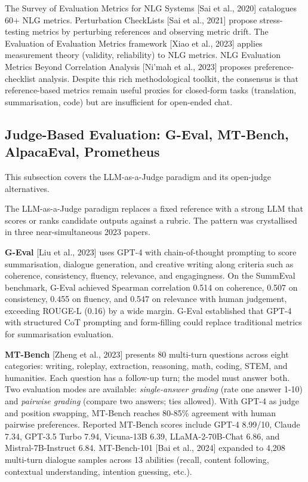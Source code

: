 The Survey of Evaluation Metrics for NLG Systems {[}Sai et al., 2020{]} catalogues 60+ NLG metrics. Perturbation CheckLists {[}Sai et al., 2021{]} propose stress-testing metrics by perturbing references and observing metric drift. The Evaluation of Evaluation Metrics framework {[}Xiao et al., 2023{]} applies measurement theory (validity, reliability) to NLG metrics. NLG Evaluation Metrics Beyond Correlation Analysis {[}Ni'mah et al., 2023{]} proposes preference-checklist analysis. Despite this rich methodological toolkit, the consensus is that reference-based metrics remain useful proxies for closed-form tasks (translation, summarisation, code) but are insufficient for open-ended chat.

\subsection{Judge-Based Evaluation: G-Eval, MT-Bench, AlpacaEval, Prometheus}\label{judge-based-evaluation-g-eval-mt-bench-alpacaeval-prometheus}

This subsection covers the LLM-as-a-Judge paradigm and its open-judge alternatives.

The LLM-as-a-Judge paradigm replaces a fixed reference with a strong LLM that scores or ranks candidate outputs against a rubric. The pattern was crystallised in three near-simultaneous 2023 papers.

\textbf{G-Eval} {[}Liu et al., 2023{]} uses GPT-4 with chain-of-thought prompting to score summarisation, dialogue generation, and creative writing along criteria such as coherence, consistency, fluency, relevance, and engagingness. On the SummEval benchmark, G-Eval achieved Spearman correlation 0.514 on coherence, 0.507 on consistency, 0.455 on fluency, and 0.547 on relevance with human judgement, exceeding ROUGE-L (0.16) by a wide margin. G-Eval established that GPT-4 with structured CoT prompting and form-filling could replace traditional metrics for summarisation evaluation.

\textbf{MT-Bench} {[}Zheng et al., 2023{]} presents 80 multi-turn questions across eight categories: writing, roleplay, extraction, reasoning, math, coding, STEM, and humanities. Each question has a follow-up turn; the model must answer both. Two evaluation modes are available: \emph{single-answer grading} (rate one answer 1-10) and \emph{pairwise grading} (compare two answers; ties allowed). With GPT-4 as judge and position swapping, MT-Bench reaches 80-85\% agreement with human pairwise preferences. Reported MT-Bench scores include GPT-4 8.99/10, Claude 7.34, GPT-3.5 Turbo 7.94, Vicuna-13B 6.39, LLaMA-2-70B-Chat 6.86, and Mistral-7B-Instruct 6.84. MT-Bench-101 {[}Bai et al., 2024{]} expanded to 4,208 multi-turn dialogue samples across 13 abilities (recall, content following, contextual understanding, intention guessing, etc.).

